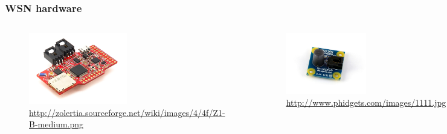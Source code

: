 \documentclass{beamer}
\begin{document}
\begin{frame}
\frametitle{WSN hardware}

	\begin{columns}

	
			\begin{figure}
				\includegraphics[width=0.5\textwidth]{images/z1.png}
				\caption{\url{http://zolertia.sourceforge.net/wiki/images/4/4f/Z1-B-medium.png}}
				\label{fig:z1}
			\end{figure}


			\begin{figure}
				\includegraphics[width=0.5\textwidth]{images/1111.jpg}
				\caption{\url{http://www.phidgets.com/images/1111.jpg}}
				\label{fig:1111}
			\end{figure}

			\begin{figure}
				\includegraphics[width=0.5\textwidth]{images/1127.jpg}
				\caption{\url{http://www.phidgets.com/images/1127.jpg}}
				\label{fig:1127}
			\end{figure}

	\end{columns}

\end{frame}
\end{document}
